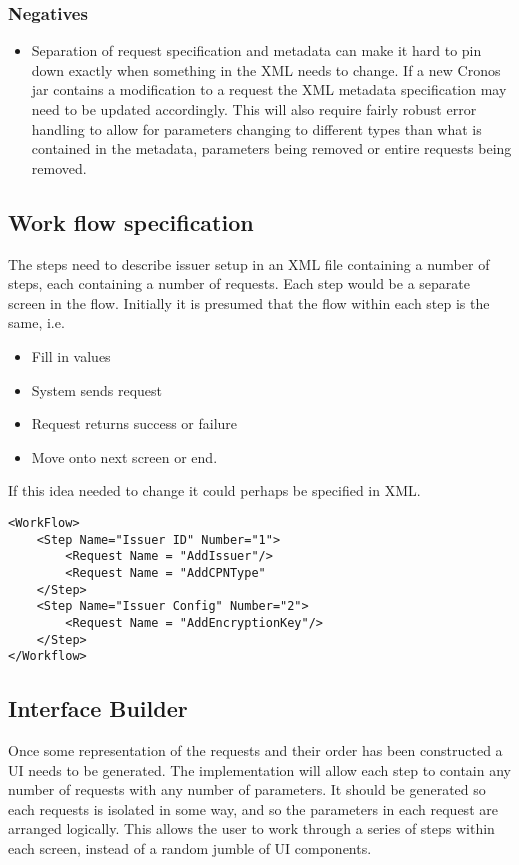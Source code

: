 \documentclass[a4paper, 11pt, titlepage]{article}
\begin{document}
		\subsubsection{Negatives}
		\begin{itemize}
		\item Separation of request specification and metadata can make it hard to pin down exactly when something in the XML needs to change. If a new Cronos jar contains a modification to a request the XML metadata specification may need to be updated accordingly. This will also require fairly robust error handling to allow for parameters changing to different types than what is contained in the metadata, parameters being removed or entire requests being removed.
		\end{itemize}

	\subsection{Work flow specification} The steps need to describe issuer setup in an XML file containing a number of steps, each containing a number of requests. Each step would be a separate screen in the flow. Initially it is presumed that the flow within each step is the same, i.e.
	\begin{itemize}
	\item Fill in values
	\item System sends request
	\item Request returns success or failure
	\item Move onto next screen or end.
	\end{itemize}
	If this idea needed to change it could perhaps be specified in XML.
	\begin{verbatim}
<WorkFlow>
    <Step Name="Issuer ID" Number="1">
        <Request Name = "AddIssuer"/>
        <Request Name = "AddCPNType"
    </Step>
    <Step Name="Issuer Config" Number="2">
        <Request Name = "AddEncryptionKey"/>
    </Step>
</Workflow>
	\end{verbatim}

	\subsection{Interface Builder}
	Once some representation of the requests and their order has been constructed a UI needs to be generated. The implementation will allow each step to contain any number of requests with any number of parameters. It should be generated so each requests is isolated in some way, and so the parameters in each request are arranged logically. This allows the user to work through a series of steps within each screen, instead of a random jumble of UI components.
\end{document}
